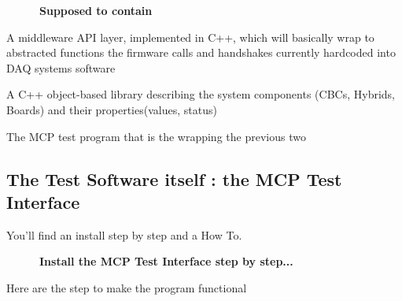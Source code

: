 ~~~~~~{\bfseries Supposed to contain}


\begin{DoxyItemize}
\item A middleware A\-P\-I layer, implemented in C++, which will basically wrap to abstracted functions the firmware calls and handshakes currently hardcoded into D\-A\-Q systems software
\item A C++ object-\/based library describing the system components (C\-B\-Cs, Hybrids, Boards) and their properties(values, status)
\item The M\-C\-P test program that is the wrapping the previous two
\end{DoxyItemize}

\subsection*{The Test Software itself \-: the M\-C\-P Test Interface }

You'll find an install step by step and a How To. \par
 \par
 ~~~~~~{\bfseries Install the M\-C\-P Test Interface step by step...}

Here are the step to make the program functional


